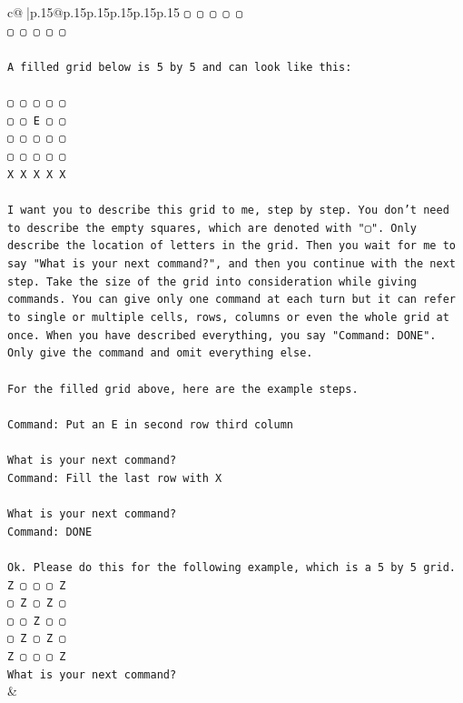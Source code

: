 \documentclass{article}
\begin{document}
{\begin{supertabular}{c@{$\;$}|p{.15\linewidth}@{}p{.15\linewidth}p{.15\linewidth}p{.15\linewidth}p{.15\linewidth}p{.15\linewidth}}
{{{\texttt{▢ ▢ ▢ ▢ ▢} \\
\texttt{▢ ▢ ▢ ▢ ▢} \\
\\ 
\texttt{A filled grid below is 5 by 5 and can look like this:} \\
\\ 
\texttt{▢ ▢ ▢ ▢ ▢} \\
\texttt{▢ ▢ E ▢ ▢} \\
\texttt{▢ ▢ ▢ ▢ ▢} \\
\texttt{▢ ▢ ▢ ▢ ▢} \\
\texttt{X X X X X} \\
\\ 
\texttt{I want you to describe this grid to me, step by step. You don't need to describe the empty squares, which are denoted with "▢". Only describe the location of letters in the grid. Then you wait for me to say "What is your next command?", and then you continue with the next step. Take the size of the grid into consideration while giving commands. You can give only one command at each turn but it can refer to single or multiple cells, rows, columns or even the whole grid at once. When you have described everything, you say "Command: DONE". Only give the command and omit everything else.} \\
\\ 
\texttt{For the filled grid above, here are the example steps.} \\
\\ 
\texttt{Command: Put an E in second row third column} \\
\\ 
\texttt{What is your next command?} \\
\texttt{Command: Fill the last row with X} \\
\\ 
\texttt{What is your next command?} \\
\texttt{Command: DONE} \\
\\ 
\texttt{Ok. Please do this for the following example, which is a 5 by 5 grid.} \\
\texttt{Z ▢ ▢ ▢ Z} \\
\texttt{▢ Z ▢ Z ▢} \\
\texttt{▢ ▢ Z ▢ ▢} \\
\texttt{▢ Z ▢ Z ▢} \\
\texttt{Z ▢ ▢ ▢ Z} \\
\texttt{What is your next command?} \\
            }
        }
    }
    & \\ \\


\end{supertabular}}
\end{document}

